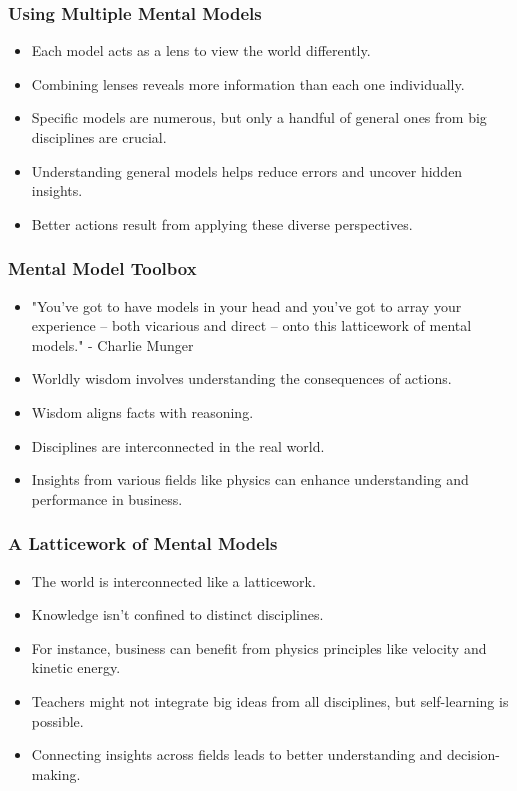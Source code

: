 \begin{frame}[fragile]\frametitle{Using Multiple Mental Models}
\begin{itemize}
    \item Each model acts as a lens to view the world differently.
    \item Combining lenses reveals more information than each one individually.
    \item Specific models are numerous, but only a handful of general ones from big disciplines are crucial.
    \item Understanding general models helps reduce errors and uncover hidden insights.
    \item Better actions result from applying these diverse perspectives.
\end{itemize}
\end{frame}

\begin{frame}[fragile]\frametitle{Mental Model Toolbox}
\begin{itemize}
    \item "You’ve got to have models in your head and you’ve got to array your experience – both vicarious and direct – onto this latticework of mental models." - Charlie Munger
    \item Worldly wisdom involves understanding the consequences of actions.
    \item Wisdom aligns facts with reasoning.
    \item Disciplines are interconnected in the real world.
    \item Insights from various fields like physics can enhance understanding and performance in business.
\end{itemize}
\end{frame}

\begin{frame}[fragile]\frametitle{A Latticework of Mental Models}
\begin{itemize}
    \item The world is interconnected like a latticework.
    \item Knowledge isn't confined to distinct disciplines.
    \item For instance, business can benefit from physics principles like velocity and kinetic energy.
    \item Teachers might not integrate big ideas from all disciplines, but self-learning is possible.
    \item Connecting insights across fields leads to better understanding and decision-making.
\end{itemize}
\end{frame}

